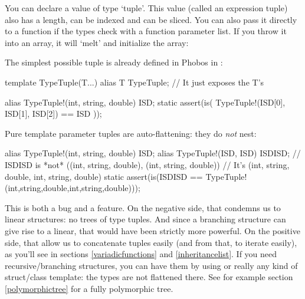 You can declare a value of type `tuple'. This value (called an expression tuple) also has a length, can be indexed and can be sliced. You can also pass it directly to a function if the types check with a function parameter list. If you throw it into an array, it will `melt' and initialize the array:


The simplest possible tuple is already defined in Phobos in :

\begin{dcode}
template TypeTuple(T...)
{
   alias T TypeTuple; // It just exposes the T's
}

alias TypeTuple!(int, string, double) ISD;
static assert(is( TypeTuple!(ISD[0], ISD[1], ISD[2]) == ISD ));
\end{dcode}

Pure template parameter tuples are auto-flattening: they do \emph{not} nest:

\begin{dcode}
alias TypeTuple!(int, string, double) ISD;
alias TypeTuple!(ISD, ISD) ISDISD; 
// ISDISD is *not* ((int, string, double), (int, string, double))
// It's (int, string, double, int, string, double)
static assert(is(ISDISD == TypeTuple!(int,string,double,int,string,double)));
\end{dcode}

This is both a bug and a feature. On the negative side, that condemns us to linear structures: no trees of type tuples. And since a branching structure can give rise to a linear, that would have been strictly more powerful. On the positive side, that allow us to concatenate tuples easily (and from that, to iterate easily), as you'll see in sections \ref{variadicfunctions} and \ref{inheritancelist}. If you need recursive/branching structures, you can have them by using  or really any kind of struct/class template: the types are not flattened there. See for example section \ref{polymorphictree} for a fully polymorphic tree.

